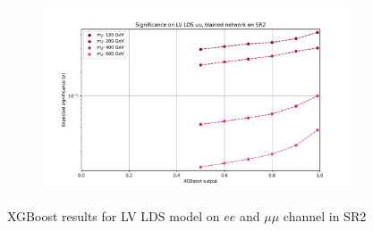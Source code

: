 \documentclass[12pt, a4paper]{book}
\begin{document}
\begin{figure}[!ht]
\begin{subfigure}[b]{0.49\textwidth}
   \end{subfigure}
   \hfill
   \begin{subfigure}[b]{0.49\textwidth}
      \centering
      \includegraphics[width=1\textwidth]{XGBoost/Model_independent/100-150/LV_LDS/EXP_SIG_uu.pdf}
   \end{subfigure}
   \caption{XGBoost results for LV LDS model on $ee$ and $\mu\mu$ channel in SR2}\label{fig:LV_LDS_SR2}
\end{figure}
\end{document}
